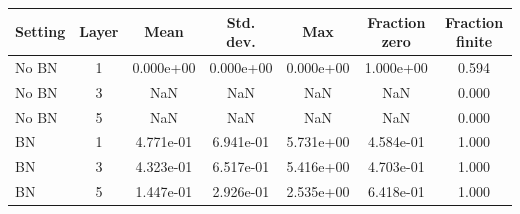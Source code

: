 \begin{tabular}{lcccccc}
\toprule
Setting & Layer & Mean & Std. dev. & Max & Fraction zero & Fraction finite \\
\midrule
No BN & 1 & 0.000e+00 & 0.000e+00 & 0.000e+00 & 1.000e+00 & 0.594 \\
No BN & 3 & NaN & NaN & NaN & NaN & 0.000 \\
No BN & 5 & NaN & NaN & NaN & NaN & 0.000 \\
BN & 1 & 4.771e-01 & 6.941e-01 & 5.731e+00 & 4.584e-01 & 1.000 \\
BN & 3 & 4.323e-01 & 6.517e-01 & 5.416e+00 & 4.703e-01 & 1.000 \\
BN & 5 & 1.447e-01 & 2.926e-01 & 2.535e+00 & 6.418e-01 & 1.000 \\
\bottomrule
\end{tabular}
